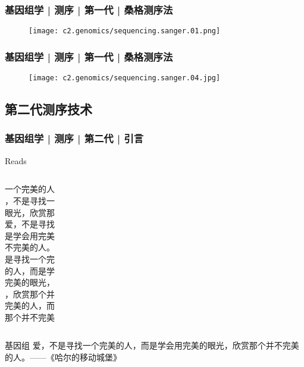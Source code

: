 \begin{frame}
  \frametitle{基因组学 | 测序 | 第一代 | 桑格测序法}
  \begin{figure}
    \centering
    \texttt{[image: c2.genomics/sequencing.sanger.01.png]}
  \end{figure}
\end{frame}

\begin{frame}
  \frametitle{基因组学 | 测序 | 第一代 | 桑格测序法}
  \begin{figure}
    \centering
    \texttt{[image: c2.genomics/sequencing.sanger.04.jpg]}
  \end{figure}
\end{frame}

\subsection{第二代测序技术}
\begin{frame}
  \frametitle{基因组学 | 测序 | 第二代 | 引言}
  \begin{block}{Reads}
    \begin{columns}
一个完美的人 \\ ，不是寻找一 \\ 眼光，欣赏那 \\ 爱，不是寻找 \\ 是学会用完美 \\  不完美的人。 \\
是寻找一个完 \\ 的人，而是学 \\ 完美的眼光， \\ ，欣赏那个并 \\ 完美的人，而 \\ 那个并不完美  \\
    \end{columns}
  \end{block}
  \pause
  \pause
  \pause
  \pause
  \begin{block}{基因组}
    爱，不是寻找一个完美的人，而是学会用完美的眼光，欣赏那个并不完美的人。——《哈尔的移动城堡》
  \end{block}
\end{frame}

